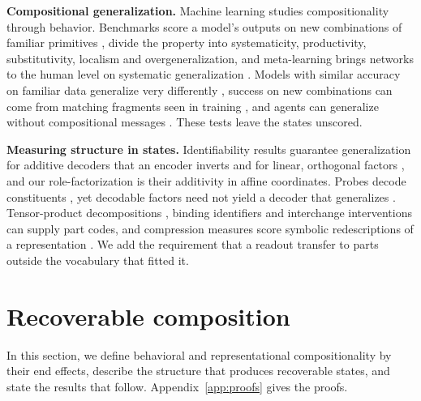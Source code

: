 \documentclass[10pt]{article}
\theoremstyle{plain}
\theoremstyle{remark}
\begin{document}
\textbf{Compositional generalization.} Machine learning studies compositionality through behavior. Benchmarks score a model's outputs on new combinations of familiar primitives \citep{lake2018,keysers2020,kim2020cogs}, \citet{hupkes2020} divide the property into systematicity, productivity, substitutivity, localism and overgeneralization, and meta-learning brings networks to the human level on systematic generalization \citep{lake2023}. Models with similar accuracy on familiar data generalize very differently \citep{mccoy2020berts}, success on new combinations can come from matching fragments seen in training \citep{dziri2023}, and agents can generalize without compositional messages \citep{chaabouni2020}. These tests leave the states unscored.

\textbf{Measuring structure in states.} Identifiability results guarantee generalization for additive decoders that an encoder inverts \citep{brady2023,lachapelle2023,wiedemer2024} and for linear, orthogonal factors \citep{uselis2026}, and our role-factorization is their additivity in affine coordinates. Probes decode constituents \citep{bernardi2020,redhardt2025}, yet decodable factors need not yield a decoder that generalizes \citep{montero2021,schott2022}. Tensor-product decompositions \citep{mccoy2019,soulos2020}, binding identifiers \citep{feng2024} and interchange interventions \citep{geiger2021,geiger2024das} can supply part codes, and compression measures score symbolic redescriptions of a representation \citep{elmoznino2024,elmoznino2026}. We add the requirement that a readout transfer to parts outside the vocabulary that fitted it.

\section{Recoverable composition}
\label{sec:definition}

In this section, we define behavioral and representational compositionality by their end effects, describe the structure that produces recoverable states, and state the results that follow. Appendix~\ref{app:proofs} gives the proofs.
\end{document}
